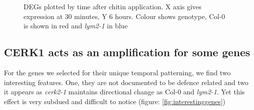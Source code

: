 \documentclass[../main.tex]{subfiles}
\begin{document}
\begin{figure}[!ht]
  \centering
  \caption{DEGs plotted by time after chitin application. X axis gives
    expression at 30 minutes, Y 6 hours. Colour shows genotype, Col-0 is shown
    in red and \textit{lym2-1} in blue}
  \label{fig:diverg}
\end{figure}


\subsection{CERK1 acts as an amplification for some genes}
\label{sec:cerk1-acts-as}

For the genes we selected for their unique temporal patterning, we find two
interesting features. One, they are not documented to be defence related and two
it appears as \textit{cerk2-1} maintains directional change as Col-0 and
\textit{lym2-1}. Yet this effect is very subdued and difficult to notice
(figure: \ref{fig:interestinggenes})
\end{document}
